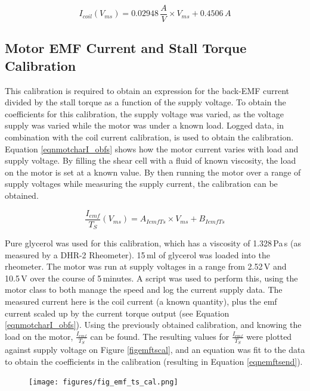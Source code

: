 \documentclass[twoside,a4]{report}
\begin{document}
	\begin{equation}
	I_{coil} (V_{ms}) = 0.02948\,\frac{A}{V} \times V_{ms} + 0.4506\,A
	\label{eqnicocalend}
	\end{equation}
	
	\subsection*{Motor EMF Current and Stall Torque Calibration}
	This calibration is required to obtain an expression for the back-EMF current divided by the stall torque as a function of the supply voltage. To obtain the coefficients for this calibration, the supply voltage was varied, as the voltage supply was varied while the motor was under a known load. Logged data, in combination with the coil current calibration, is used to obtain the calibration. Equation \ref{eqnmotcharI_obfs} shows how the motor current varies with load and supply voltage. By filling the shear cell with a fluid of known viscosity, the load on the motor is set at a known value. By then running the motor over a range of supply voltages while measuring the supply current, the calibration can be obtained.
	
	\begin{equation}
	\frac{I_{emf}}{T_S} (V_{ms}) = A_{IemfTs} \times V_{ms} + B_{IemfTs}
	\label{eqnemftsmid}
	\end{equation}
	
	\noindent
	Pure glycerol was used for this calibration, which has a viscosity of 1.328\,Pa\,s (as measured by a DHR-2 Rheometer). 15\,ml of glycerol was loaded into the rheometer. The motor was run at supply voltages in a range from 2.52\,V and 10.5\,V over the course of 5\,minutes. A script was used to perform this, using the motor class to both manage the speed and log the current supply data. The measured current here is the coil current (a known quantity), plus the emf current scaled up by the current torque output (see Equation \ref{eqnmotcharI_obfs}). Using the previously obtained calibration, and knowing the load on the motor, $\frac{I_{emf}}{T_S}$ can be found. The resulting values for $\frac{I_{emf}}{T_S}$ were plotted against supply voltage on Figure \ref{figemftscal}, and an equation was fit to the data to obtain the coefficients in the calibration (resulting in Equation \ref{eqnemftsend}).
	
	\begin{figure}[!htb]
		\centering
		\texttt{[image: figures/fig\_emf\_ts\_cal.png]}
		\caption{EMF Current \& Stall Torque Calibration Results}
		\label{figemftscal}
		\begin{subfigure}{0.9\textwidth}
			\footnotesize 
		\end{subfigure}
	\end{figure}
\end{document}
